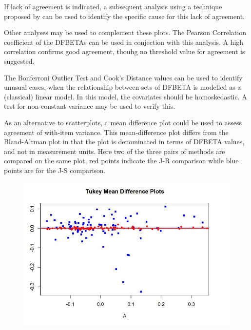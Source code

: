 \documentclass[12pt, a4paper]{report}
\theoremstyle{plain}
\theoremstyle{definition}
\theoremstyle{remark}
\begin{document}
If lack of agreement is indicated, a subsequent analysis using a technique proposed by \citet{ARoy2009} can be used to identify the specific cause for this lack of agreement.
	
Other analyses may be used to complement these plots. The Pearson Correlation coefficient of the DFBETAs can be used in conjection with this analysis. A high correlation confirms good agreement, thouhg no threshold value for agreement is suggested.
	
The Bonferroni Outlier Test and Cook's Distance values can be used to identify unusual cases, when the relationship between sets of DFBETA is modelled as a (classical) linear model. In this model, the covariates should be homoskedastic. A test for non-constant variance may be used to verify this. 
	
	
As an alternative to scatterplots, a mean difference plot could be used to assess agreement of with-item variance. This mean-difference plot differs from the Bland-Altman plot in that the plot is denominated in terms of DFBETA values, and not in measurement units. Here two of the three pairs of methods are compared on the same plot, red points indicate the J-R comparison while blue points are for the J-S comparison.

	\begin{figure}[h!
		]
		\centering
		\includegraphics[width=0.7\linewidth]{images/04-TMDplot}
		
	\end{figure}
	


\end{document}
